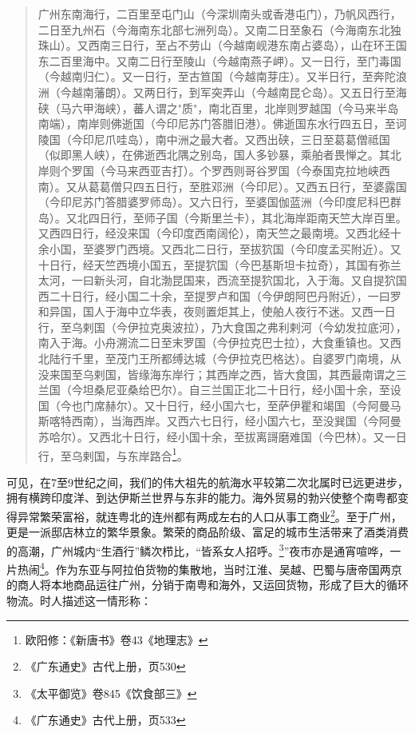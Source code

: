 \begin{quote}
	
广州东南海行，二百里至屯门山（今深圳南头或香港屯门），乃帆风西行，二日至九州石（今海南东北部七洲列岛）。又南二日至象石（今海南东北独珠山）。又西南三日行，至占不劳山（今越南岘港东南占婆岛），山在环王国东二百里海中。又南二日行至陵山（今越南燕子岬）。又一日行，至门毒国（今越南归仁）。又一日行，至古笪国（今越南芽庄）。又半日行，至奔陀浪洲（今越南藩朗）。又两日行，到军突弄山（今越南昆仑岛）。又五日行至海硖（马六甲海峡），蕃人谓之"质"，南北百里，北岸则罗越国（今马来半岛南端），南岸则佛逝国（今印尼苏门答腊旧港）。佛逝国东水行四五日，至诃陵国（今印尼爪哇岛），南中洲之最大者。又西出硖，三日至葛葛僧祗国（似即黑人峡），在佛逝西北隅之别岛，国人多钞暴，乘舶者畏惮之。其北岸则个罗国（今马来西亚吉打）。个罗西则哥谷罗国（今泰国克拉地峡西南）。又从葛葛僧只四五日行，至胜邓洲（今印尼）。又西五日行，至婆露国（今印尼苏门答腊婆罗师岛）。又六日行，至婆国伽蓝洲（今印度尼科巴群岛）。又北四日行，至师子国（今斯里兰卡），其北海岸距南天竺大岸百里。又西四日行，经没来国（今印度西南阔伦），南天竺之最南境。又西北经十余小国，至婆罗门西境。又西北二日行，至拔狖国（今印度孟买附近）。又十日行，经天竺西境小国五，至提狖国（今巴基斯坦卡拉奇），其国有弥兰太河，一曰新头河，自北渤昆国来，西流至提狖国北，入于海。又自提狖国西二十日行，经小国二十余，至提罗卢和国（今伊朗阿巴丹附近），一曰罗和异国，国人于海中立华表，夜则置炬其上，使舶人夜行不迷。又西一日行，至乌剌国（今伊拉克奥波拉），乃大食国之弗利剌河（今幼发拉底河），南入于海。小舟溯流二日至末罗国（今伊拉克巴士拉），大食重镇也。又西北陆行千里，至茂门王所都缚达城（今伊拉克巴格达）。自婆罗门南境，从没来国至乌剌国，皆缘海东岸行；其西岸之西，皆大食国，其西最南谓之三兰国（今坦桑尼亚桑给巴尔）。自三兰国正北二十日行，经小国十余，至设国（今也门席赫尔）。又十日行，经小国六七，至萨伊瞿和竭国（今阿曼马斯喀特西南），当海西岸。又西六七日行，经小国六七，至没巽国（今阿曼苏哈尔）。又西北十日行，经小国十余，至拔离謌磨难国（今巴林）。又一日行，至乌剌国，与东岸路合\footnote{欧阳修：《新唐书》卷43《地理志》}。
\end{quote}

可见，在7至9世纪之间，我们的伟大祖先的航海水平较第二次北属时已远更进步，拥有横跨印度洋、到达伊斯兰世界与东非的能力。海外贸易的勃兴使整个南粤都变得异常繁荣富裕，就连粤北的连州都有两成左右的人口从事工商业\footnote{《广东通史》古代上册，页530}。至于广州，更是一派邸店林立的繁华景象。繁荣的商品阶级、富足的城市生活带来了酒类消费的高潮，广州城内“生酒行”鳞次栉比，“皆系女人招呼。\footnote{《太平御览》卷845《饮食部三》}”夜市亦是通宵喧哗，一片热闹\footnote{《广东通史》古代上册，页533}。作为东亚与阿拉伯货物的集散地，当时江淮、吴越、巴蜀与唐帝国两京的商人将本地商品运往广州，分销于南粤和海外，又运回货物，形成了巨大的循环物流。时人描述这一情形称：

